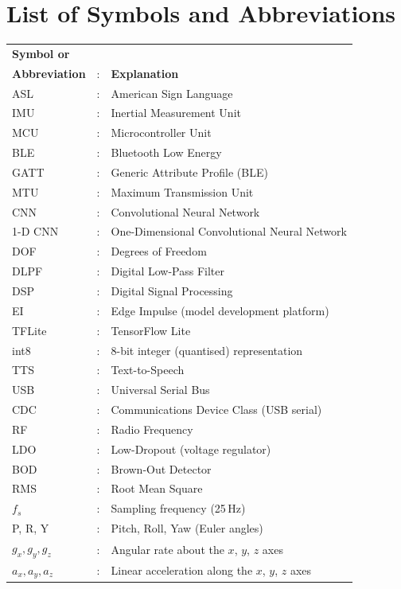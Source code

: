 \chapter*{List of Symbols and Abbreviations}

\begin{tabular}{lcl}
    \textbf{Symbol or}&&\\
    \textbf{Abbreviation} &:& \textbf{Explanation}\\


    ASL    &:& American Sign Language\\
    IMU    &:& Inertial Measurement Unit\\
    MCU    &:& Microcontroller Unit\\
    BLE    &:& Bluetooth Low Energy\\
    GATT   &:& Generic Attribute Profile (BLE)\\
    MTU    &:& Maximum Transmission Unit\\
    CNN    &:& Convolutional Neural Network\\
    1-D CNN&:& One-Dimensional Convolutional Neural Network\\
    DOF    &:& Degrees of Freedom\\
    DLPF   &:& Digital Low-Pass Filter\\
    DSP    &:& Digital Signal Processing\\
    EI     &:& Edge Impulse (model development platform)\\
    TFLite &:& TensorFlow Lite\\
    int8   &:& 8-bit integer (quantised) representation\\
    TTS    &:& Text-to-Speech\\
    USB    &:& Universal Serial Bus\\
    CDC    &:& Communications Device Class (USB serial)\\
    RF     &:& Radio Frequency\\
    LDO    &:& Low-Dropout (voltage regulator)\\
    BOD    &:& Brown-Out Detector\\
    RMS    &:& Root Mean Square\\
    $f_s$  &:& Sampling frequency (25\,Hz)\\
    P, R, Y&:& Pitch, Roll, Yaw (Euler angles)\\
    $g_x,g_y,g_z$ &:& Angular rate about the $x$, $y$, $z$ axes\\
    $a_x,a_y,a_z$ &:& Linear acceleration along the $x$, $y$, $z$ axes\\

\end{tabular}

\clearpage
